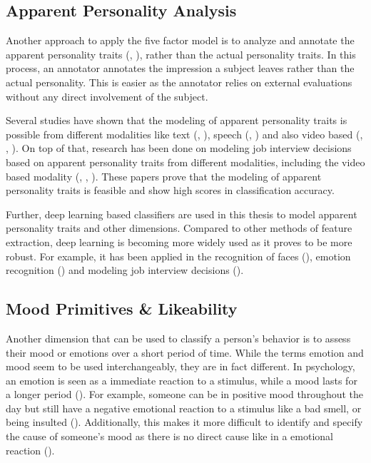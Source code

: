 \subsection{Apparent Personality Analysis}

Another approach to apply the five factor model is to analyze and annotate the apparent personality traits (\cite{junior2018first}, \cite{chen2016overcoming}), rather than the actual personality traits. In this process, an annotator annotates the impression a subject leaves rather than the actual personality. This is easier as the annotator relies on external evaluations without any direct involvement of the subject. 

Several studies have shown that the modeling of apparent personality traits is possible from different modalities like text (\cite{gievska2014impact}, \cite{alam2013personality}), speech (\cite{valente2012annotation}, \cite{madzlan2014towards}) and also video based (\cite{junior2018first}, \cite{qin2016modern}, \cite{escalante2020modeling}). On top of that, research has been done on modeling job interview decisions based on apparent personality traits from different modalities, including the video based modality (\cite{kaya2017multi}, \cite{kaya2018multimodal}, \cite{yu2019multimodal}). These papers prove that the modeling of apparent personality traits is feasible and show high scores in classification accuracy. 

Further, deep learning based classifiers are used in this thesis to model apparent personality traits and other dimensions. Compared to other methods of feature extraction, deep learning is becoming more widely used as it proves to be more robust. For example, it has been applied in the recognition of faces (\cite{parkhi2015deep}), emotion recognition (\cite{kaya2017video}) and modeling job interview decisions (\cite{kaya2018multimodal}). 

\subsection{Mood Primitives \& Likeability}
Another dimension that can be used to classify a person's behavior is to assess their mood or emotions over a short period of time. While the terms emotion and mood seem to be used interchangeably, they are in fact different. In psychology, an emotion is seen as a immediate reaction to a stimulus, while a mood lasts for a longer period (\cite{bower2000affectmemory}). For example, someone can be in positive mood throughout the day but still have a negative emotional reaction to a stimulus like a bad smell, or being insulted (\cite{matlin2012cognition}). Additionally, this makes it more difficult to identify and specify the cause of someone's mood as there is no direct cause like in a emotional reaction (\cite{desmet2016mood}).

